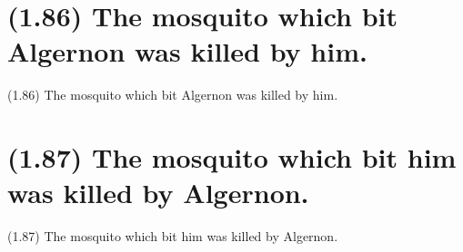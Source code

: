 \documentclass{article}
\begin{document}
\clearpage

%
%

\section*{(1.86) The mosquito which bit Algernon was killed by him.}

\bigbreak
\begin{enumerate*}
\item[(1.86)] The mosquito which bit Algernon was killed by him.
\end{enumerate*}
\bigbreak

\bigbreak
\begin{minipage}{\textwidth}
\end{minipage}
\bigbreak

\clearpage

%
%

\section*{(1.87) The mosquito which bit him was killed by Algernon.}

\bigbreak
\begin{enumerate*}
\item[(1.87)] The mosquito which bit him was killed by Algernon.
\end{enumerate*}
\bigbreak

\bigbreak
\begin{minipage}{\textwidth}
\end{minipage}
\bigbreak
\end{document}

